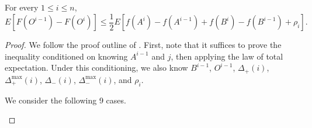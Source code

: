 \begin{lem}\label{lem:singleelement} For every $1 \leq i \leq n$,
\[E[F(O^{i-1})-F(O^i)] \leq \frac{1}{2} E[f(A^i) - f(A^{i-1}) + f(B^i) - f(B^{i-1}) + \rho_i].\]
\end{lem}
\begin{proof}
We follow the proof outline of \cite{buchbinder2012}.
First, note that it suffices to prove the inequality conditioned on knowing $A^{i-1}$ and $j$, then applying the law of total expectation.
Under this conditioning, we also know $B^{i-1}$, $O^{i-1}$, $\Delta_+(i)$, $\Delta_+^{\max}(i)$, $\Delta_-(i)$, $\Delta_-^{\max}(i)$, and $\rho_i$.

We consider the following 9 cases.

\begin{description}




\end{description}
\end{proof}
